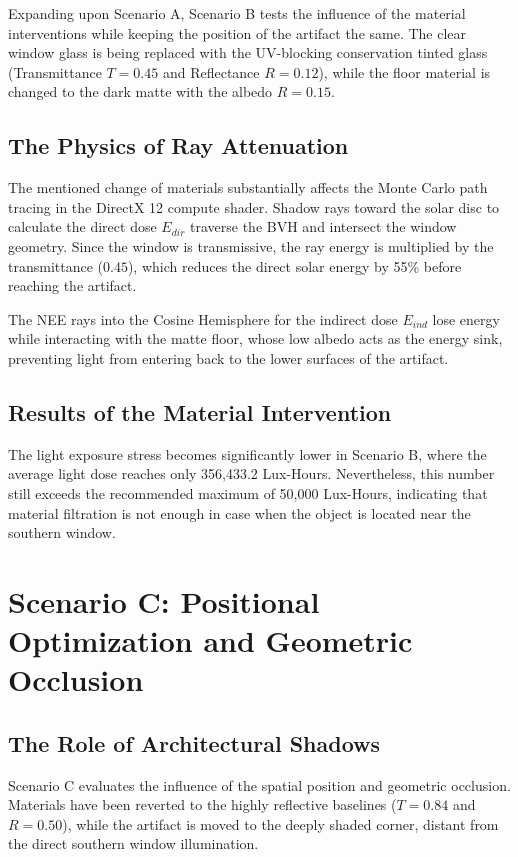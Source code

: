 Expanding upon Scenario A, Scenario B tests the influence of the material interventions while keeping the position of the artifact the same. The clear window glass is being replaced with the UV-blocking conservation tinted glass (Transmittance $T = 0.45$ and Reflectance $R = 0.12$), while the floor material is changed to the dark matte with the albedo $R = 0.15$.

\subsection{The Physics of Ray Attenuation}

The mentioned change of materials substantially affects the Monte Carlo path tracing in the DirectX 12 compute shader. Shadow rays toward the solar disc to calculate the direct dose $E_{dir}$ traverse the BVH and intersect the window geometry. Since the window is transmissive, the ray energy is multiplied by the transmittance ($0.45$), which reduces the direct solar energy by 55\% before reaching the artifact.

The NEE rays into the Cosine Hemisphere for the indirect dose $E_{ind}$ lose energy while interacting with the matte floor, whose low albedo acts as the energy sink, preventing light from entering back to the lower surfaces of the artifact.

\subsection{Results of the Material Intervention}

The light exposure stress becomes significantly lower in Scenario B, where the average light dose reaches only 356,433.2 Lux-Hours. Nevertheless, this number still exceeds the recommended maximum of 50,000 Lux-Hours, indicating that material filtration is not enough in case when the object is located near the southern window.

\section{Scenario C: Positional Optimization and Geometric Occlusion}

\subsection{The Role of Architectural Shadows}

Scenario C evaluates the influence of the spatial position and geometric occlusion. Materials have been reverted to the highly reflective baselines ($T = 0.84$ and $R = 0.50$), while the artifact is moved to the deeply shaded corner, distant from the direct southern window illumination.

